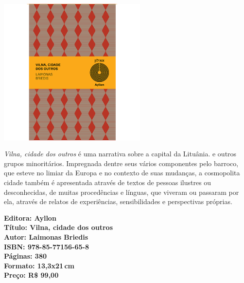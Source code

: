 \pagestyle{ayllon}
\label{ayllon}


\pagebreak
\begin{center}
\hspace*{-3.6cm}
\hspace*{3.1cm}\includegraphics[width=74mm]{./CAPAS/AYLLON_VILNA.jpg}
\end{center}
\hspace*{-7cm}\hrulefill\hspace*{-7cm}
\medskip

\noindent{}\textit{Vilna, cidade dos outros} é uma narrativa sobre a capital da Lituânia.  e outros grupos minoritários. Impregnada dentre seus vários componentes pelo barroco, que esteve no limiar da Europa e no contexto de suas mudanças, a cosmopolita cidade também é apresentada através de textos de pessoas ilustres ou desconhecidas, de muitas procedências e línguas, que viveram ou passaram por ela, através de relatos de experiências, sensibilidades e perspectivas próprias.

\vfill
\hspace*{-.4cm}\begin{minipage}[c]{1\linewidth}
\small\textbf{
\hspace*{-.1cm}Editora: Ayllon\\
Título: Vilna, cidade dos outros\\
Autor: Laimonas Briedis\\ 
ISBN: 978-85-77156-65-8\\
Páginas: 380\\
Formato: 13,3x21\,cm\\
Preço: R\$ 99,00\\
}
\end{minipage}
\pagebreak

